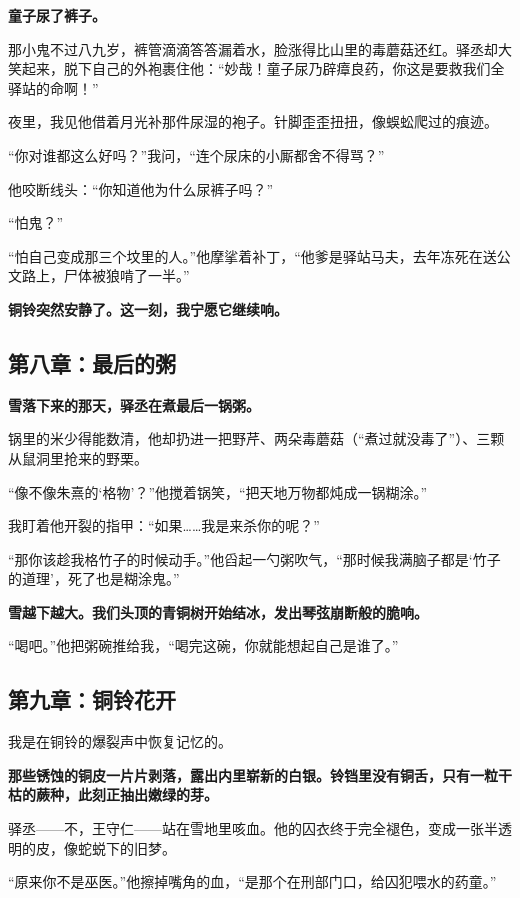 \documentclass{article}
\begin{document}
	\textbf{童子尿了裤子。 } 
	
	那小鬼不过八九岁，裤管滴滴答答漏着水，脸涨得比山里的毒蘑菇还红。驿丞却大笑起来，脱下自己的外袍裹住他：“妙哉！童子尿乃辟瘴良药，你这是要救我们全驿站的命啊！”  
	
	夜里，我见他借着月光补那件尿湿的袍子。针脚歪歪扭扭，像蜈蚣爬过的痕迹。  
	
	“你对谁都这么好吗？”我问，“连个尿床的小厮都舍不得骂？”  
	
	他咬断线头：“你知道他为什么尿裤子吗？”  
	
	“怕鬼？”  
	
	“怕自己变成那三个坟里的人。”他摩挲着补丁，“他爹是驿站马夫，去年冻死在送公文路上，尸体被狼啃了一半。”  
	
	\textbf{铜铃突然安静了。这一刻，我宁愿它继续响。} 
	
	\subsection{第八章：最后的粥}
	
	\textbf{雪落下来的那天，驿丞在煮最后一锅粥。}  
	
	锅里的米少得能数清，他却扔进一把野芹、两朵毒蘑菇（“煮过就没毒了”）、三颗从鼠洞里抢来的野栗。  
	
	“像不像朱熹的‘格物’？”他搅着锅笑，“把天地万物都炖成一锅糊涂。”  
	
	我盯着他开裂的指甲：“如果……我是来杀你的呢？”  
	
	“那你该趁我格竹子的时候动手。”他舀起一勺粥吹气，“那时候我满脑子都是‘竹子的道理’，死了也是糊涂鬼。”  
	
	\textbf{雪越下越大。我们头顶的青铜树开始结冰，发出琴弦崩断般的脆响。 } 
	
	“喝吧。”他把粥碗推给我，“喝完这碗，你就能想起自己是谁了。” 
	
	\subsection{第九章：铜铃花开}
	
	我是在铜铃的爆裂声中恢复记忆的。  
	
	\textbf{那些锈蚀的铜皮一片片剥落，露出内里崭新的白银。铃铛里没有铜舌，只有一粒干枯的蕨种，此刻正抽出嫩绿的芽。}  
	
	驿丞——不，王守仁——站在雪地里咳血。他的囚衣终于完全褪色，变成一张半透明的皮，像蛇蜕下的旧梦。  
	
	“原来你不是巫医。”他擦掉嘴角的血，“是那个在刑部门口，给囚犯喂水的药童。”  
	
\end{document}
